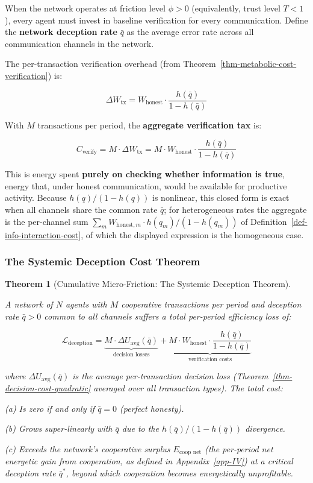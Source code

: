 \documentclass[11pt]{article}
\theoremstyle{plain}
\newtheorem{theorem}{Theorem}
\theoremstyle{definition}
\theoremstyle{remark}
\let\origsubsubsection\subsubsection
\renewcommand{\subsubsection}{\needspace{4\baselineskip}\origsubsubsection}
\begin{document}
When the network operates at friction level \(\phi > 0\) (equivalently,
trust level \(T < 1\)), every agent must invest in baseline verification
for every communication. Define the \textbf{network deception rate}
\(\bar{q}\) as the average error rate across all communication channels
in the network.

The per-transaction verification overhead (from
Theorem~\ref{thm-metabolic-cost-verification}) is:

\[\Delta W_{\text{tx}} = W_{\text{honest}} \cdot \frac{h(\bar{q})}{1 - h(\bar{q})}\]

With \(M\) transactions per period, the \textbf{aggregate verification
tax} is:

\[C_{\text{verify}} = M \cdot \Delta W_{\text{tx}} = M \cdot W_{\text{honest}} \cdot \frac{h(\bar{q})}{1 - h(\bar{q})}\]

This is energy spent \textbf{purely on checking whether information is
true}, energy that, under honest communication, would be available for
productive activity. Because \(h(q)/(1 - h(q))\) is nonlinear, this
closed form is exact when all channels share the common rate
\(\bar{q}\); for heterogeneous rates the aggregate is the per-channel
sum \(\sum_m W_{\text{honest},m} \cdot h(q_m)/(1 - h(q_m))\) of
Definition~\ref{def-info-interaction-cost}, of which the displayed
expression is the homogeneous case.

\subsubsection{The Systemic Deception Cost
Theorem}\label{the-systemic-deception-cost-theorem}

\begin{theorem}[Cumulative Micro-Friction: The Systemic Deception Theorem]
\label{thm-systemic-deception}

A network of $N$ agents with $M$ cooperative transactions per period and deception rate $\bar{q} > 0$ common to all channels suffers a total per-period efficiency loss of:

$$\mathcal{L}_{\text{deception}} = \underbrace{M \cdot \Delta U_{\text{avg}}(\bar{q})}_{\text{decision losses}} + \underbrace{M \cdot W_{\text{honest}} \cdot \frac{h(\bar{q})}{1 - h(\bar{q})}}_{\text{verification costs}}$$

where $\Delta U_{\text{avg}}(\bar{q})$ is the average per-transaction decision loss (Theorem~\ref{thm-decision-cost-quadratic} averaged over all transaction types). The total cost:

(a) Is zero if and only if $\bar{q} = 0$ (perfect honesty).

(b) Grows super-linearly with $\bar{q}$ due to the $h(\bar{q})/(1 - h(\bar{q}))$ divergence.

(c) Exceeds the network's cooperative surplus $E_{\text{coop net}}$ (the per-period net energetic gain from cooperation, as defined in Appendix~\ref{app-IV}) at a critical deception rate $\bar{q}^*$, beyond which cooperation becomes energetically unprofitable.
\end{theorem}
\end{document}
